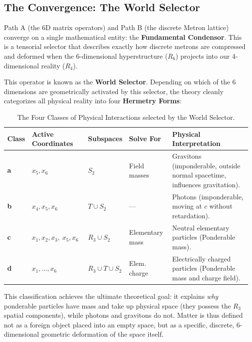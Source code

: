 \documentclass[11pt,a4paper,oneside]{article}
\begin{document}
\subsection{The Convergence: The World Selector}

Path A (the 6D matrix operators) and Path B (the discrete Metron lattice) converge on a single mathematical entity: the \textbf{Fundamental Condensor}. This is a tensorial selector that describes exactly how discrete metrons are compressed and deformed when the 6-dimensional hyperstructure ($R_6$) projects into our 4-dimensional reality ($R_4$). 

This operator is known as the \textbf{World Selector}. Depending on which of the 6 dimensions are geometrically activated by this selector, the theory cleanly categorizes all physical reality into four \textbf{Hermetry Forms}:

\begin{table}[htbp]
\centering
\renewcommand{\arraystretch}{1.4}
\begin{tabular}{llllp{5cm}}
\toprule
\textbf{Class} & \textbf{Active Coordinates} & \textbf{Subspaces} & \textbf{Solve For} & \textbf{Physical Interpretation} \\
\midrule
\rowcolor{theoryblue!5}
\textbf{a} & $x_5, x_6$ & $S_2$ & Field masses & Gravitons (imponderable, outside normal spacetime, influences gravitation). \\
\textbf{b} & $x_4, x_5, x_6$ & $T \cup S_2$ & --- & Photons (imponderable, moving at $c$ without retardation). \\
\rowcolor{theoryblue!5}
\textbf{c} & $x_1, x_2, x_3, \ x_5, x_6$ & $R_3 \cup S_2$ & Elementary mass & Neutral elementary particles (Ponderable mass). \\
\textbf{d} & $x_1, \dots, x_6$ & $R_3 \cup T \cup S_2$ & Elem. charge & Electrically charged particles (Ponderable mass and charge field). \\
\bottomrule
\end{tabular}
\caption{The Four Classes of Physical Interactions selected by the World Selector.}
\end{table}

This classification achieves the ultimate theoretical goal: it explains \textit{why} ponderable particles have mass and take up physical space (they possess the $R_3$ spatial components), while photons and gravitons do not. Matter is thus defined not as a foreign object placed into an empty space, but as a specific, discrete, 6-dimensional geometric deformation of the space itself.
\end{document}
